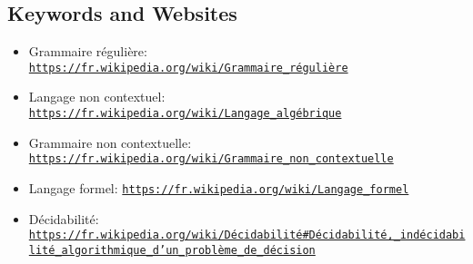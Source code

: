 \documentclass[a4paper,11pt]{report}
\newcommand{\BrochureUrlText}[1]{\texttt{#1}}
\begin{document}
{\raggedright

\subsection*{Keywords and Websites}

\begin{itemize}
  \item Grammaire régulière: \href{https://fr.wikipedia.org/wiki/Grammaire_r\%C3\%A9guli\%C3\%A8re}{\BrochureUrlText{https://fr.wikipedia.org/wiki/Grammaire\_régulière}}
  \item Langage non contextuel: \href{https://fr.wikipedia.org/wiki/Langage_alg\%C3\%A9brique}{\BrochureUrlText{https://fr.wikipedia.org/wiki/Langage\_algébrique}}
  \item Grammaire non contextuelle: \href{https://fr.wikipedia.org/wiki/Grammaire_non_contextuelle}{\BrochureUrlText{https://fr.wikipedia.org/wiki/Grammaire\_non\_contextuelle}}
  \item Langage formel: \href{https://fr.wikipedia.org/wiki/Langage_formel}{\BrochureUrlText{https://fr.wikipedia.org/wiki/Langage\_formel}}
  \item Décidabilité: \href{https://fr.wikipedia.org/wiki/D\%C3\%A9cidabilit\%C3\%A9\#D\%C3\%A9cidabilit\%C3\%A9,_ind\%C3\%A9cidabilit\%C3\%A9_algorithmique_d'un_probl\%C3\%A8me_de_d\%C3\%A9cision}{\BrochureUrlText{https://fr.wikipedia.org/wiki/Décidabilité\#Décidabilité,\_indécidabilité\_algorithmique\_d’un\_problème\_de\_décision}}
\end{itemize}


}
\end{document}
